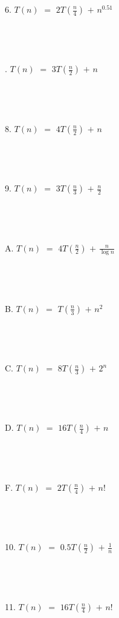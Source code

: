 \documentclass[12pt]{article}
\begin{document}
6. $T(n)$ $=$ $2T(\frac{n}{4})$ $+$ $n^{0.51}$\\\\\\\\\\
\newpage
{}. $T(n)$ $=$ $3T(\frac{n}{2})$ $+$ $n$\\\\\\\\\\
8. $T(n)$ $=$ $4T(\frac{n}{2})$ $+$ $n$\\\\\\\\\\
9. $T(n)$ $=$ $3T(\frac{n}{3})$ $+$ $\frac{n}{2}$\\\\\\\\\\
A. $T(n)$ $=$ $4T(\frac{n}{2})$ $+$ $\frac{n}{\log{n}}$\\\\\\\\\\
B. $T(n)$ $=$ $T(\frac{n}{3})$ $+$ $n^2$\\\\\\\\\\
C. $T(n)$ $=$ $8T(\frac{n}{3})$ $+$ $2^n$\\\\\\\\\\
D. $T(n)$ $=$ $16T(\frac{n}{4})$ $+$ $n$\\\\\\\\\\
\newpage
\noindent F. $T(n)$ $=$ $2T(\frac{n}{4})$ $+$ $n!$\\\\\\\\\\
10. $T(n)$ $=$ $0.5T(\frac{n}{2})$ $+$ $\frac{1}{n}$\\\\\\\\\\
11. $T(n)$ $=$ $16T(\frac{n}{4})$ $+$ $n!$\\\\\\\\\\
\end{document}
